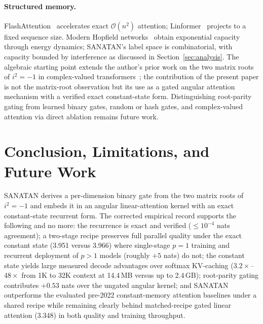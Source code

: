 \documentclass{article}
\newcommand{\cO}{\mathcal{O}}
\begin{document}
\paragraph{Structured memory.} FlashAttention~\cite{dao2022flashattention} accelerates exact $\cO(n^2)$ attention; Linformer~\cite{wang2020linformer} projects to a fixed sequence size. Modern Hopfield networks~\cite{ramsauer2021hopfield} obtain exponential capacity through energy dynamics; SANATAN's label space is combinatorial, with capacity bounded by interference as discussed in Section~\ref{sec:analysis}. The algebraic starting point extends the author's prior work on the two matrix roots of $i^2=-1$ in complex-valued transformers~\cite{patel2025quantuminspired}; the contribution of the present paper is not the matrix-root observation but its use as a gated angular attention mechanism with a verified exact constant-state form. Distinguishing root-parity gating from learned binary gates, random or hash gates, and complex-valued attention via direct ablation remains future work.

\section{Conclusion, Limitations, and Future Work}
\label{sec:limitations}

SANATAN derives a per-dimension binary gate from the two matrix roots of $i^2 = -1$ and embeds it in an angular linear-attention kernel with an exact constant-state recurrent form. The corrected empirical record supports the following and no more: the recurrence is exact and verified ($\leq 10^{-4}$ nats agreement); a two-stage recipe preserves full parallel quality under the exact constant state (3.951 versus 3.966) where single-stage $p=1$ training and recurrent deployment of $p>1$ models (roughly $+5$ nats) do not; the constant state yields large measured decode advantages over softmax KV-caching ($3.2\times$--$48\times$ from 1K to 32K context at 14.4\,MB versus up to 2.4\,GB); root-parity gating contributes $+0.53$ nats over the ungated angular kernel; and SANATAN outperforms the evaluated pre-2022 constant-memory attention baselines under a shared recipe while remaining clearly behind matched-recipe gated linear attention (3.348) in both quality and training throughput.
\end{document}
